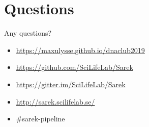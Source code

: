\documentclass[usepdftitle=false]{beamer}
\begin{document}
{
	\section{Questions}
	\begin{frame}[plain]{Any questions?}
		\vspace{-5.3cm}
		\begin{itemize}
			\item[\faGlobe] \url{https://maxulysse.github.io/dnaclub2019}
			\item[\faGithub] \url{https://github.com/SciLifeLab/Sarek}
			\item[\faGitter] \url{https://gitter.im/SciLifeLab/Sarek}
			\item[\faGlobe] \url{http://sarek.scilifelab.se/}
			\item[\faSlack] \#sarek-pipeline
		\end{itemize}
	\end{frame}
}
\end{document}
